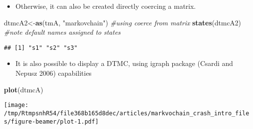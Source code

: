 \documentclass[ignorenonframetext,]{beamer}
\newenvironment{Shaded}{\begin{snugshade}}{\end{snugshade}}
\newcommand{\CommentTok}[1]{\textcolor[rgb]{0.56,0.35,0.01}{\textit{#1}}}
\newcommand{\KeywordTok}[1]{\textcolor[rgb]{0.13,0.29,0.53}{\textbf{#1}}}
\newcommand{\NormalTok}[1]{#1}
\newcommand{\StringTok}[1]{\textcolor[rgb]{0.31,0.60,0.02}{#1}}
\providecommand{\tightlist}{%
  \setlength{\itemsep}{0pt}\setlength{\parskip}{0pt}}
\providecommand{\tightlist}{
  \setlength{\itemsep}{0pt}\setlength{\parskip}{0pt}
}
\begin{document}
\begin{frame}[fragile]

\begin{itemize}
\tightlist
\item
  Otherwise, it can also be created directly coercing a matrix.
\end{itemize}

\begin{Shaded}
\begin{Highlighting}[]
\NormalTok{dtmcA2<-}\KeywordTok{as}\NormalTok{(tmA, }\StringTok{"markovchain"}\NormalTok{) }\CommentTok{#using coerce from matrix}
\KeywordTok{states}\NormalTok{(dtmcA2) }\CommentTok{#note default names assigned to states}
\end{Highlighting}
\end{Shaded}

\begin{verbatim}
## [1] "s1" "s2" "s3"
\end{verbatim}

\end{frame}

\begin{frame}[fragile]

\begin{itemize}
\tightlist
\item
  It is also possible to display a DTMC, using igraph package (Csardi
  and Nepusz 2006) capabilities
\end{itemize}

\begin{Shaded}
\begin{Highlighting}[]
\KeywordTok{plot}\NormalTok{(dtmcA)}
\end{Highlighting}
\end{Shaded}

\texttt{[image: /tmp/RtmpsnhR54/file368b165d8dec/articles/markvochain\_crash\_intro\_files/figure-beamer/plot-1.pdf]}

\end{frame}
\end{document}
